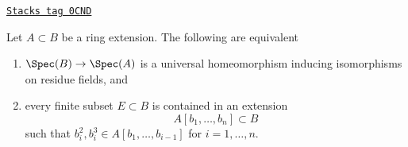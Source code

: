 \begin{proposition}
\label{morphisms-proposition-universal-homeomorphism-equal-residue-fields}
\href{https://stacks.math.columbia.edu/tag/0CND}{\texttt{Stacks tag 0CND}}

Let $A \subset B$ be a ring extension. The following are equivalent
\begin{enumerate}
\item $\Spec(B) \to \Spec(A)$ is a universal homeomorphism inducing
isomorphisms on residue fields, and
\item every finite subset $E \subset B$ is contained in an extension
$$
A[b_1, \ldots, b_n] \subset B
$$
such that $b_i^2, b_i^3 \in A[b_1, \ldots, b_{i - 1}]$ for $i = 1, \ldots, n$.
\end{enumerate}
\end{proposition}

